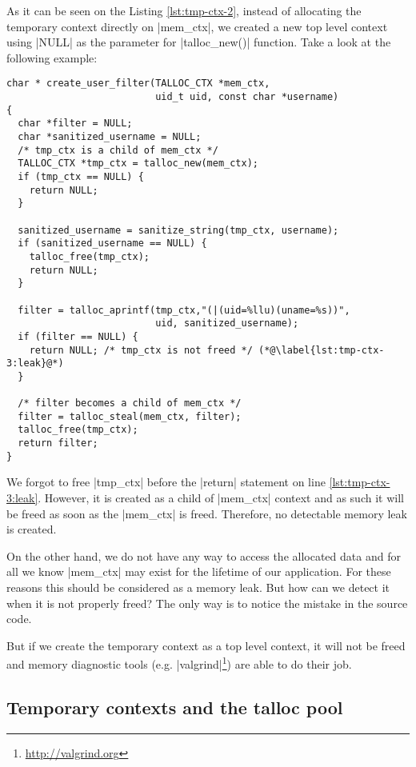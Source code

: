 As it can be seen on the Listing \ref{lst:tmp-ctx-2}, instead of allocating the
temporary context directly on |mem_ctx|, we created a new top level context
using |NULL| as the parameter for |talloc_new()| function. Take a look at the
following example:

\begin{lstlisting}[caption={Temporary context \#3},label=lst:tmp-ctx-3]
char * create_user_filter(TALLOC_CTX *mem_ctx,
                          uid_t uid, const char *username)
{
  char *filter = NULL;
  char *sanitized_username = NULL;
  /* tmp_ctx is a child of mem_ctx */
  TALLOC_CTX *tmp_ctx = talloc_new(mem_ctx);
  if (tmp_ctx == NULL) {
    return NULL;
  }
  
  sanitized_username = sanitize_string(tmp_ctx, username);
  if (sanitized_username == NULL) {
    talloc_free(tmp_ctx);
    return NULL;
  }
  
  filter = talloc_aprintf(tmp_ctx,"(|(uid=%llu)(uname=%s))",
                          uid, sanitized_username);
  if (filter == NULL) {
    return NULL; /* tmp_ctx is not freed */ (*@\label{lst:tmp-ctx-3:leak}@*)
  }
  
  /* filter becomes a child of mem_ctx */
  filter = talloc_steal(mem_ctx, filter);
  talloc_free(tmp_ctx);
  return filter;
}
\end{lstlisting}

\noindent
We forgot to free |tmp_ctx| before the |return| statement on line
\ref{lst:tmp-ctx-3:leak}. However, it is created as a child of |mem_ctx| context
and as such it will be freed as soon as the |mem_ctx| is freed. Therefore, no
detectable memory leak is created.

On the other hand, we do not have any way to access the allocated data
and for all we know |mem_ctx| may exist for the lifetime of our application.
For these reasons this should be considered as a memory leak. But how can we
detect it when it is not properly freed? The only way is to notice the mistake in
the source code.

But if we create the temporary context as a top level context, it will not be
freed and memory diagnostic tools
(e.g. |valgrind|\footnote{\url{http://valgrind.org}}) are able to do their job.

\subsection{Temporary contexts and the talloc pool}
\label{talloc:subsec:tmp-ctx-and-pool}

